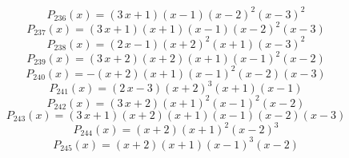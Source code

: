 \subitem \begin{dmath*}P_{236}(x) = {\left(3 \, x + 1\right)} {\left(x - 1\right)} {\left(x - 2\right)}^{2} {\left(x - 3\right)}^{2} \end{dmath*}\vspace{-1.2cm}
\subitem \begin{dmath*}P_{237}(x) = {\left(3 \, x + 1\right)} {\left(x + 1\right)} {\left(x - 1\right)} {\left(x - 2\right)}^{2} {\left(x - 3\right)} \end{dmath*}\vspace{-1.2cm}
\subitem \begin{dmath*}P_{238}(x) = {\left(2 \, x - 1\right)} {\left(x + 2\right)}^{2} {\left(x + 1\right)} {\left(x - 3\right)}^{2} \end{dmath*}\vspace{-1.2cm}
\subitem \begin{dmath*}P_{239}(x) = {\left(3 \, x + 2\right)} {\left(x + 2\right)} {\left(x + 1\right)} {\left(x - 1\right)}^{2} {\left(x - 2\right)} \end{dmath*}\vspace{-1.2cm}
\subitem \begin{dmath*}P_{240}(x) = -{\left(x + 2\right)} {\left(x + 1\right)} {\left(x - 1\right)}^{2} {\left(x - 2\right)} {\left(x - 3\right)} \end{dmath*}\vspace{-1.2cm}
\subitem \begin{dmath*}P_{241}(x) = {\left(2 \, x - 3\right)} {\left(x + 2\right)}^{3} {\left(x + 1\right)} {\left(x - 1\right)} \end{dmath*}\vspace{-1.2cm}
\subitem \begin{dmath*}P_{242}(x) = {\left(3 \, x + 2\right)} {\left(x + 1\right)}^{2} {\left(x - 1\right)}^{2} {\left(x - 2\right)} \end{dmath*}\vspace{-1.2cm}
\subitem \begin{dmath*}P_{243}(x) = {\left(3 \, x + 1\right)} {\left(x + 2\right)} {\left(x + 1\right)} {\left(x - 1\right)} {\left(x - 2\right)} {\left(x - 3\right)} \end{dmath*}\vspace{-1.2cm}
\subitem \begin{dmath*}P_{244}(x) = {\left(x + 2\right)} {\left(x + 1\right)}^{2} {\left(x - 2\right)}^{3} \end{dmath*}\vspace{-1.2cm}
\subitem \begin{dmath*}P_{245}(x) = {\left(x + 2\right)} {\left(x + 1\right)} {\left(x - 1\right)}^{3} {\left(x - 2\right)} \end{dmath*}\vspace{-1.2cm}
